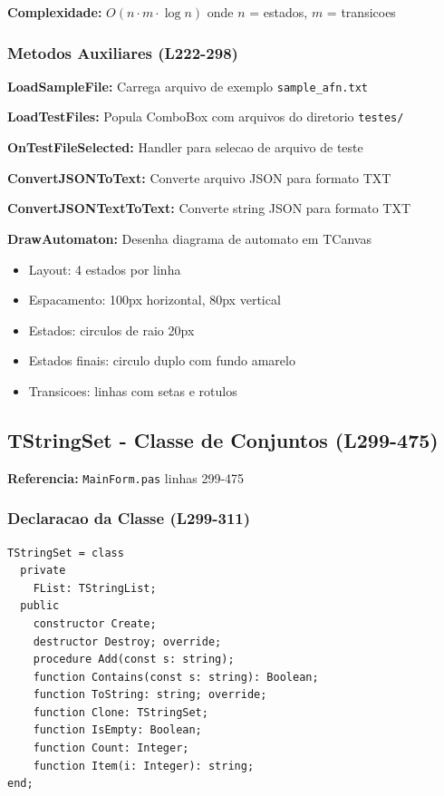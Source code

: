 \documentclass[12pt,a4paper]{article}
\begin{document}
\textbf{Complexidade:} $O(n \cdot m \cdot \log n)$ onde $n$ = estados, $m$ = transicoes

\subsubsection{Metodos Auxiliares (L222-298)}

\textbf{LoadSampleFile:} Carrega arquivo de exemplo \texttt{sample\_afn.txt}

\textbf{LoadTestFiles:} Popula ComboBox com arquivos do diretorio \texttt{testes/}

\textbf{OnTestFileSelected:} Handler para selecao de arquivo de teste

\textbf{ConvertJSONToText:} Converte arquivo JSON para formato TXT

\textbf{ConvertJSONTextToText:} Converte string JSON para formato TXT

\textbf{DrawAutomaton:} Desenha diagrama de automato em TCanvas
\begin{itemize}
    \item Layout: 4 estados por linha
    \item Espacamento: 100px horizontal, 80px vertical
    \item Estados: circulos de raio 20px
    \item Estados finais: circulo duplo com fundo amarelo
    \item Transicoes: linhas com setas e rotulos
\end{itemize}

\subsection{TStringSet - Classe de Conjuntos (L299-475)}

\textbf{Referencia:} \texttt{MainForm.pas} linhas 299-475

\subsubsection{Declaracao da Classe (L299-311)}

\begin{lstlisting}[style=pascal, caption={Classe TStringSet}]
TStringSet = class
  private
    FList: TStringList;
  public
    constructor Create;
    destructor Destroy; override;
    procedure Add(const s: string);
    function Contains(const s: string): Boolean;
    function ToString: string; override;
    function Clone: TStringSet;
    function IsEmpty: Boolean;
    function Count: Integer;
    function Item(i: Integer): string;
end;
\end{lstlisting}
\end{document}
